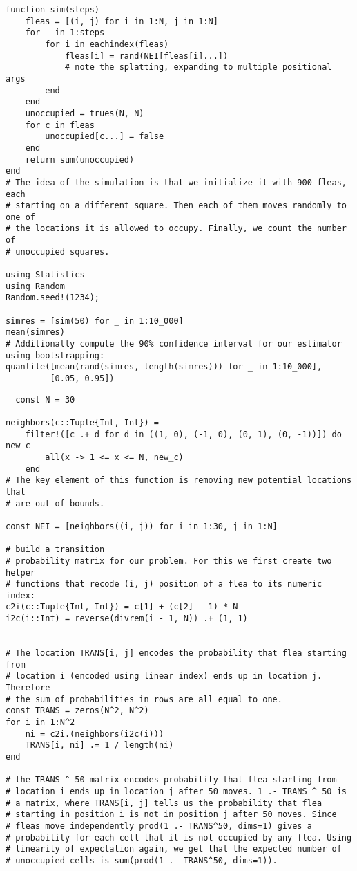 \documentclass[12pt]{article}
\begin{document}
\begin{solution}
\begin{lstlisting}
function sim(steps)
    fleas = [(i, j) for i in 1:N, j in 1:N]
    for _ in 1:steps
        for i in eachindex(fleas)
            fleas[i] = rand(NEI[fleas[i]...])
            # note the splatting, expanding to multiple positional args
        end
    end
    unoccupied = trues(N, N)
    for c in fleas
        unoccupied[c...] = false
    end
    return sum(unoccupied)
end
# The idea of the simulation is that we initialize it with 900 fleas, each
# starting on a different square. Then each of them moves randomly to one of
# the locations it is allowed to occupy. Finally, we count the number of
# unoccupied squares.

using Statistics
using Random
Random.seed!(1234);

simres = [sim(50) for _ in 1:10_000]
mean(simres)
# Additionally compute the 90% confidence interval for our estimator using bootstrapping:
quantile([mean(rand(simres, length(simres))) for _ in 1:10_000],
         [0.05, 0.95])
\end{lstlisting}

\begin{lstlisting}
  const N = 30

neighbors(c::Tuple{Int, Int}) =
    filter!([c .+ d for d in ((1, 0), (-1, 0), (0, 1), (0, -1))]) do new_c
        all(x -> 1 <= x <= N, new_c)
    end
# The key element of this function is removing new potential locations that
# are out of bounds.

const NEI = [neighbors((i, j)) for i in 1:30, j in 1:N]

# build a transition
# probability matrix for our problem. For this we first create two helper
# functions that recode (i, j) position of a flea to its numeric index:
c2i(c::Tuple{Int, Int}) = c[1] + (c[2] - 1) * N
i2c(i::Int) = reverse(divrem(i - 1, N)) .+ (1, 1)    


# The location TRANS[i, j] encodes the probability that flea starting from
# location i (encoded using linear index) ends up in location j. Therefore
# the sum of probabilities in rows are all equal to one.
const TRANS = zeros(N^2, N^2)
for i in 1:N^2
    ni = c2i.(neighbors(i2c(i)))
    TRANS[i, ni] .= 1 / length(ni)
end

# the TRANS ^ 50 matrix encodes probability that flea starting from
# location i ends up in location j after 50 moves. 1 .- TRANS ^ 50 is
# a matrix, where TRANS[i, j] tells us the probability that flea
# starting in position i is not in position j after 50 moves. Since
# fleas move independently prod(1 .- TRANS^50, dims=1) gives a
# probability for each cell that it is not occupied by any flea. Using
# linearity of expectation again, we get that the expected number of
# unoccupied cells is sum(prod(1 .- TRANS^50, dims=1)).


\end{lstlisting}
\end{solution}
\end{document}
